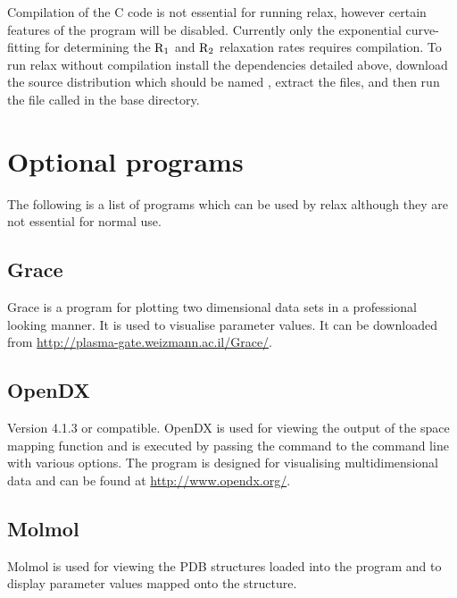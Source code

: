 Compilation of the C code is not essential for running relax, however certain features of the program will be disabled.  Currently only the exponential curve-fitting for determining the $\mathrm{R}_1$ and $\mathrm{R}_2$ relaxation rates requires compilation.  To run relax without compilation install the dependencies detailed above, download the source distribution which should be named , extract the files, and then run the file called  in the base directory.




\section{Optional programs}

The following is a list of programs which can be used by relax although they are not essential for normal use.


\subsection{Grace}

Grace is a program for plotting two dimensional data sets in a professional looking manner.  It is used to visualise parameter values.  It can be downloaded from \href{http://plasma-gate.weizmann.ac.il/Grace/}{http://plasma-gate.weizmann.ac.il/Grace/}.


\subsection{OpenDX}

Version 4.1.3 or compatible.  OpenDX is used for viewing the output of the space mapping function and is executed by passing the command  to the command line with various options.  The program is designed for visualising multidimensional data and can be found at \href{http://www.opendx.org/}{http://www.opendx.org/}.


\subsection{Molmol}

Molmol is used for viewing the PDB structures loaded into the program and to display parameter values mapped onto the structure.


